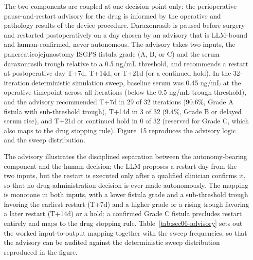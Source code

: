 The two components are coupled at one decision point only: the perioperative
pause-and-restart advisory for the drug is informed by the operative and pathology
results of the device procedure. Daraxonrasib is paused before surgery and restarted
postoperatively on a day chosen by an advisory that is LLM-bound and human-confirmed,
never autonomous. The advisory takes two inputs, the pancreaticojejunostomy ISGPS
fistula grade (A, B, or C) and the serum daraxonrasib trough relative to a 0.5 ng/mL
threshold, and recommends a restart at postoperative day T+7d, T+14d, or T+21d (or a
continued hold). In the 32-iteration deterministic simulation sweep, baseline serum
was 0.45 ng/mL at the operative timepoint across all iterations (below the 0.5 ng/mL
trough threshold), and the advisory recommended T+7d in 29 of 32 iterations (90.6\%,
Grade A fistula with sub-threshold trough), T+14d in 3 of 32 (9.4\%, Grade B or
delayed serum rise), and T+21d or continued hold in 0 of 32 (reserved for Grade C,
which also maps to the drug stopping rule). Figure~15 reproduces the advisory logic
and the sweep distribution.

The advisory illustrates the disciplined separation between the autonomy-bearing
component and the human decision: the LLM proposes a restart day from the two inputs,
but the restart is executed only after a qualified clinician confirms it, so that no
drug-administration decision is ever made autonomously. The mapping is monotone in
both inputs, with a lower fistula grade and a sub-threshold trough favoring the
earliest restart (T+7d) and a higher grade or a rising trough favoring a later
restart (T+14d) or a hold; a confirmed Grade C fistula precludes restart entirely and
maps to the drug stopping rule. Table~\ref{tab:sec06-advisory} sets out the worked
input-to-output mapping together with the sweep frequencies, so that the advisory can
be audited against the deterministic sweep distribution reproduced in the figure.

